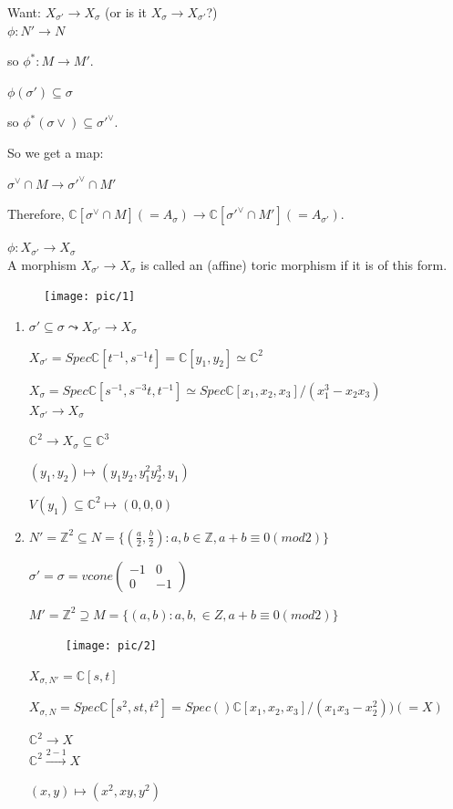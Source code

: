 \documentclass[a4paper,12pt]{amsart}
\newcommand{\C}{\ensuremath{\mathbb{C}}}
\newcommand{\Z}{\ensuremath{\mathbb{Z}}}
\newcommand{\iv}{\ensuremath{^{-1}}}
\begin{document}
Want: $X_{\sigma'}\to X_\sigma$ (or is it $X_\sigma \to X_{\sigma'}$?)
\\

$ \phi: N'\to N $

so  $ \phi^*: M\to M' $.

$ \phi(\sigma')\subseteq \sigma $

so $\phi^*(\sigma\vee)\subseteq \sigma'^\vee$.

So we get a map:

$\sigma^\vee\cap M\to \sigma'^\vee \cap M'$

Therefore, $\C[\sigma^\vee \cap M] (=A_\sigma)\to \C[\sigma'^\vee \cap M'](=A_{\sigma'})$.

$\phi:X_{\sigma'}\to X_\sigma$
\\

A morphism $X_{\sigma'}\to X_\sigma$ is called an (affine) toric morphism if it is of this form.
\\

\begin{Eg}
	\begin{figure}[htbp]\centering
		\texttt{[image: pic/1]}
	\end{figure}
\begin{enumerate}[1)]
	\item $\sigma' \subseteq \sigma\leadsto X_{\sigma'}\to X_\sigma$
	
	$X_{\sigma'}=Spec\C[t\iv, s\iv t]=\C[y_1,y_2]\simeq \C^2$
	
	$X_\sigma = Spec\C[s\iv, s^{-3}t, t\iv] \simeq Spec\C[x_1,x_2,x_3]/(x_1^3-x_2x_3)$
	\\
	
	$X_{\sigma'}\to X_\sigma$
	
	$\C^2\to X_\sigma\subseteq \C^3$
	
	$(y_1,y_2)\mapsto (y_1y_2,y_1^2y_2^3,y_1)$
	
	$V(y_1)\subseteq \C^2 \mapsto (0,0,0)$
	\item  $N'=\Z^2 \subseteq N=\{(\frac{a}{2},\frac{b}{2}): a,b\in \Z, a+b\equiv 0 (mod 2) \}$
	
	$\sigma'=\sigma = vcone \begin{pmatrix} -1 & 0 \\ 0 & -1 \end{pmatrix}$
	
	$M'=\Z^2 \supseteq M= \{(a,b): a,b,\in Z, a+b\equiv 0 (mod2)\}$
	
	\begin{figure}[htbp]\centering
		\texttt{[image: pic/2]}
	\end{figure}
	
	$X_{\sigma,N'}=\C[s,t]$
	
	$X_{\sigma,N}=Spec\C[s^2,st,t^2]=Spec()\C[x_1,x_2,x_3]/(x_1x_3-x_2^2))(=X)$
	
	$\C^2\to X$
	\\
	
	$\C^2\xrightarrow{2-1} X$
	
	$(x,y)\mapsto (x^2,xy,y^2)$
\end{enumerate}
\end{Eg}
\end{document}
